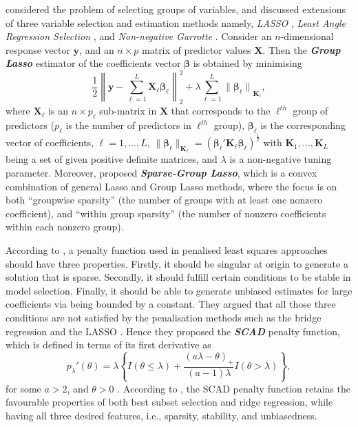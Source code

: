 \documentclass[11pt,a4paper,]{article}
\begin{document}
\textcite{Yuan2006} considered the problem of selecting groups of
variables, and discussed extensions of three variable selection and
estimation methods namely, \emph{LASSO} \autocite{Tibshirani1996},
\emph{Least Angle Regression Selection} \autocite[LARS,][]{Efron2004},
and \emph{Non-negative Garrotte} \autocite{Breiman1995}. Consider an
\(n\)-dimensional response vector \(\bm{y}\), and an \(n \times p\)
matrix of predictor values \(\bm{X}\). Then the \textbf{\emph{Group
Lasso}} estimator of the coefficients vector \(\bm{\beta}\) is obtained
by minimising \[
 \frac{1}{2}\left\lVert\bm{y} - \sum_{\ell=1}^{L} {\bm{X}_{\ell}\bm{\beta}_{\ell}}\right\rVert_{2}^{2} + \lambda\sum_{\ell=1}^{L} {\lVert\bm{\beta}_{\ell}\rVert}_{\bm{K}_{\ell}},
\] where \(\bm{X}_{\ell}\) is an \(n \times p_{\ell}\) sub-matrix in
\(\bm{X}\) that corresponds to the \(\ell^{th}\) group of predictors
(\(p_{\ell}\) is the number of predictors in \(\ell^{th}\) group),
\(\bm{\beta}_{\ell}\) is the corresponding vector of coefficients,
\(\ell = 1, \dots, L\),
\(\lVert\bm{\beta}_{\ell}\rVert_{\bm{K}_{\ell}} = (\bm{\beta}_{\ell}' \bm{K}_{\ell} \bm{\beta}_{\ell})^{\frac{1}{2}}\)
with \(\bm{K}_{1}, \dots, \bm{K}_{L}\) being a set of given positive
definite matrices, and \(\lambda\) is a non-negative tuning parameter.
Moreover, \textcite{Simon2013} proposed \textbf{\emph{Sparse-Group
Lasso}}, which is a convex combination of general Lasso and Group Lasso
methods, where the focus is on both ``groupwise sparsity'' (the number
of groups with at least one nonzero coefficient), and ``within group
sparsity'' (the number of nonzero coefficients within each nonzero
group).

According to \textcite{Fan2001}, a penalty function used in penalised
least squares approaches should have three properties. Firstly, it
should be singular at origin to generate a solution that is sparse.
Secondly, it should fulfill certain conditions to be stable in model
selection. Finally, it should be able to generate unbiased estimates for
large coefficients via being bounded by a constant. They argued that all
those three conditions are not satisfied by the penalisation methods
such as the bridge regression \autocite{Frank1993} and the LASSO
\autocite{Tibshirani1996}. Hence they proposed the \textbf{\emph{SCAD}}
penalty function, which is defined in terms of its first derivative as
\[
 p_{\lambda}'(\theta) = \lambda\left\{I(\theta\le\lambda) + \frac{(a\lambda - \theta)_{+}}{(a - 1)\lambda}I(\theta > \lambda)\right\},
\] for some \(a > 2\), and \(\theta > 0\) \autocite{Fan2001}. According
to \textcite{Fan2001}, the SCAD penalty function retains the favourable
properties of both best subset selection and ridge regression, while
having all three desired features, i.e., sparsity, stability, and
unbiasedness.
\end{document}
